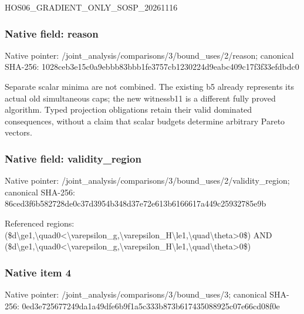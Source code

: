 \documentclass[10pt,a4paper]{article}
\begin{document}
\begingroup\raggedright\sloppy HOS06\_\allowbreak{}GRADIENT\_\allowbreak{}ONLY\_\allowbreak{}SOSP\_\allowbreak{}20261116\par\endgroup

\subsubsection{Native field: reason}
Native pointer: /joint\_\allowbreak{}analysis/comparisons/3/bound\_\allowbreak{}uses/2/reason; canonical SHA-256: 1028ceb3e15c0a9ebbb83bbb1fe3757cb1230224d9eabc409c17f3f33efdbdc0

\begingroup\raggedright\sloppy Separate scalar minima are not combined. The existing b5 already represents its actual old simultaneous caps;\allowbreak{} the new witnessb11 is a different fully proved algorithm. Typed projection obligations retain their valid dominated consequences,\allowbreak{} without a claim that scalar budgets determine arbitrary Pareto vectors.\par\endgroup

\subsubsection{Native field: validity\_\allowbreak{}region}
Native pointer: /joint\_\allowbreak{}analysis/comparisons/3/bound\_\allowbreak{}uses/2/validity\_\allowbreak{}region; canonical SHA-256: 86ced3f6b582728de0c37d3954b348d37e72e613b6166617a449c25932785e9b

\begingroup\raggedright\sloppy Referenced regions:\allowbreak{} (\$d\textbackslash{}ge1,\allowbreak{}\textbackslash{}quad0<\textbackslash{}varepsilon\_\allowbreak{}g,\allowbreak{}\textbackslash{}varepsilon\_\allowbreak{}H\textbackslash{}le1,\allowbreak{}\textbackslash{}quad\textbackslash{}theta>0\$) AND (\$d\textbackslash{}ge1,\allowbreak{}\textbackslash{}quad0<\textbackslash{}varepsilon\_\allowbreak{}g,\allowbreak{}\textbackslash{}varepsilon\_\allowbreak{}H\textbackslash{}le1,\allowbreak{}\textbackslash{}quad\textbackslash{}theta>0\$)\par\endgroup

\subsubsection{Native item 4}
Native pointer: /joint\_\allowbreak{}analysis/comparisons/3/bound\_\allowbreak{}uses/3; canonical SHA-256: 0ed3e725677249da1a49dfe6b9f1a5c333b873b617435088925c07e66cd08f0e
\end{document}
